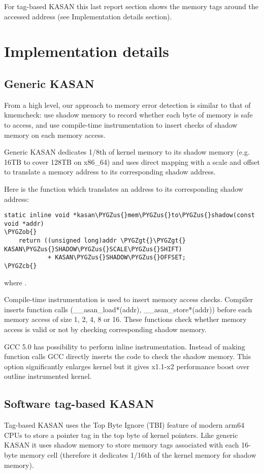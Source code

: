 \documentclass[a4paper,8pt,english]{sphinxmanual}
\def\PYGZus{\char`\_}
\def\PYGZob{\char`\{}
\def\PYGZcb{\char`\}}
\def\PYGZgt{\char`\>}
\begin{document}
For tag-based KASAN this last report section shows the memory tags around the
accessed address (see Implementation details section).


\section{Implementation details}
\label{dev-tools/kasan:implementation-details}

\subsection{Generic KASAN}
\label{dev-tools/kasan:generic-kasan}
From a high level, our approach to memory error detection is similar to that
of kmemcheck: use shadow memory to record whether each byte of memory is safe
to access, and use compile-time instrumentation to insert checks of shadow
memory on each memory access.

Generic KASAN dedicates 1/8th of kernel memory to its shadow memory (e.g. 16TB
to cover 128TB on x86\_64) and uses direct mapping with a scale and offset to
translate a memory address to its corresponding shadow address.

Here is the function which translates an address to its corresponding shadow
address:

\begin{Verbatim}[commandchars=\\\{\}]
static inline void *kasan\PYGZus{}mem\PYGZus{}to\PYGZus{}shadow(const void *addr)
\PYGZob{}
    return ((unsigned long)addr \PYGZgt{}\PYGZgt{} KASAN\PYGZus{}SHADOW\PYGZus{}SCALE\PYGZus{}SHIFT)
            + KASAN\PYGZus{}SHADOW\PYGZus{}OFFSET;
\PYGZcb{}
\end{Verbatim}

where .

Compile-time instrumentation is used to insert memory access checks. Compiler
inserts function calls (\_\_asan\_load*(addr), \_\_asan\_store*(addr)) before each
memory access of size 1, 2, 4, 8 or 16. These functions check whether memory
access is valid or not by checking corresponding shadow memory.

GCC 5.0 has possibility to perform inline instrumentation. Instead of making
function calls GCC directly inserts the code to check the shadow memory.
This option significantly enlarges kernel but it gives x1.1-x2 performance
boost over outline instrumented kernel.


\subsection{Software tag-based KASAN}
\label{dev-tools/kasan:software-tag-based-kasan}
Tag-based KASAN uses the Top Byte Ignore (TBI) feature of modern arm64 CPUs to
store a pointer tag in the top byte of kernel pointers. Like generic KASAN it
uses shadow memory to store memory tags associated with each 16-byte memory
cell (therefore it dedicates 1/16th of the kernel memory for shadow memory).
\end{document}
